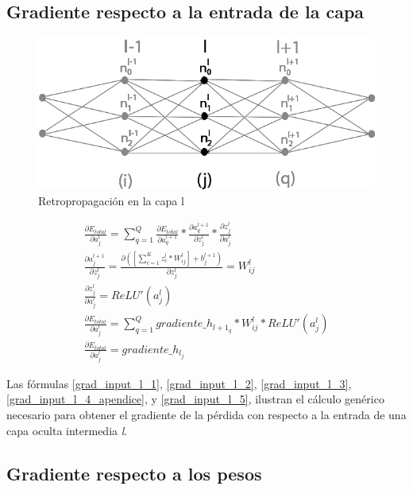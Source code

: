\subsection{Gradiente respecto a la entrada de la capa}

\begin{figure}[H]
	\centering
	\includegraphics[scale=0.35]{imagenes/conclusion_capa_l.jpg}  
	\caption{Retropropagación en la capa l}
	\label{fig:conclusion_capa_l_apendice}
\end{figure}

\begin{gather}
	\frac{\partial E_{total}}{\partial a^l_j} = \sum_{q=1}^Q \frac{\partial E_{total}}{\partial a^{l+1}_q} * \frac{\partial a^{l+1}_q}{\partial z^l_j} * \frac{\partial z^l_j}{\partial a^l_j} \label{grad_input_l_1} \\
	\frac{\partial a^{l+1}_j }{\partial z^l_j } = \frac{\partial ([\sum_{c=1}^{K} z^l_c * W^l_{ij}] + b^{l+1}_j) }{\partial z^l_j } = W^l_{ij} \label{grad_input_l_2} \\
	\frac{\partial z^l_j}{\partial a^l_j} = ReLU'(a^l_j) \label{grad_input_l_3} \\
	\frac{\partial E_{total}}{\partial a^l_j} = \sum_{q=1}^Q  gradiente\_h_{{l+1}_q} * W^l_{ij} * ReLU'(a^l_j) \label{grad_input_l_4_apendice} \\
	\frac{\partial E_{total}}{\partial a^l_j} = gradiente\_h_{l_j} \label{grad_input_l_5}
\end{gather}

Las fórmulas \ref{grad_input_l_1}, \ref{grad_input_l_2}, \ref{grad_input_l_3},  \ref{grad_input_l_4_apendice}, y \ref{grad_input_l_5}, ilustran el cálculo genérico necesario para obtener el gradiente de la pérdida con respecto a la entrada de una capa oculta intermedia \textit{l}.

\subsection{Gradiente respecto a los pesos}

